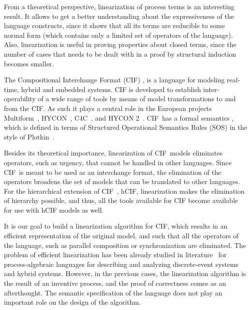 \documentclass[submission,copyright,creativecommons,sharealike]{eptcs}
\newcommand{\CIF}{{CIF}}
\begin{document}
From a theoretical perspective, linearization of process terms is an
interesting result. It allows to get a better understanding about the
expressiveness of the language constructs, since it shows that all its
terms are reducible to some normal form (which contains only a limited
set of operators of the language). Also, linearization is useful in
proving properties about closed terms, since the number of cases that
needs to be dealt with in a proof by structural
induction becomes smaller.

The Compositional Interchange Format
(CIF) \cite{Baeten7:MultiformCIF2D112Tech10}, is a language for
modeling real-time, hybrid and embedded systems. CIF is developed to establish
inter-operability of a wide range of tools by means of model
transformations to and from the CIF. As such it plays a central role in the
European projects Multiform~\cite{MULTIFORM:MULTIFORMMisc08},
HYCON~\cite{HYCONNoE:HYCONMisc05}, C4C~\cite{C4C:C4CMisc08}, and HYCON
2~\cite{HYCONII11}. \CIF\
has a formal semantics \cite{Baeten7:MultiformCIF2D112Tech10}, which
is defined in terms of Structured Operational Semantics Rules (SOS) in
the style of Plotkin~\cite{PlotkinSOSArtJLAP04}.

Besides its theoretical importance, linearization of \CIF\ models
eliminates operators, such as urgency, that cannot be handled in other
languages.
Since \CIF\ is meant to be used as an interchange format, the
elimination of the operators broadens the set of models that can be
translated to other languages.
For the hierarchical extension of \CIF~\cite{BeoharNadales:hCIF10}, hCIF,
linearization makes the elimination of hierarchy possible, and thus,
all the tools available for CIF become available for use with hCIF models as
well.

It is our goal to build a linearization algorithm for \CIF, which
results in an efficient representation of the original model,
and such that all the operators of the language, such as
  parallel composition or synchronization are eliminated. The
problem of efficient linearization has been already studied in
literature~\cite{Usenko:LinearizationMuCRLPhD02,
  BrandReniCuij:LinHybProcJLAP06, Khadim3:LinHChiPCTech07} for
process-algebraic languages for describing and analyzing
discrete-event systems and hybrid systems.
However, in the previous cases, the linearization algorithm is the
result of an inventive process, and the proof of correctness comes as
an afterthought. The semantic specification of the language does not
play an important
role on the design of the algorithm.
\end{document}
